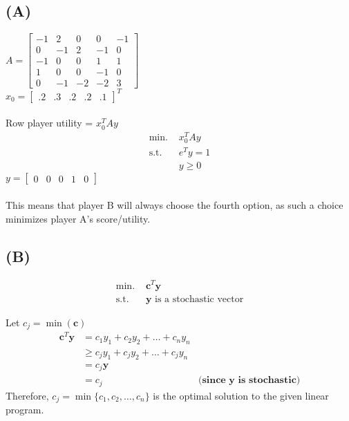 \documentclass[12pt]{article}
\begin{document}
\subsection*{(A)}
$A = \begin{bmatrix}
    -1 & 2 & 0 & 0 & -1 \\
    0 & -1 & 2 & -1 & 0 \\
    -1 & 0 & 0 & 1 & 1 \\
    1 & 0 & 0 & -1 & 0 \\
    0 & -1 & -2 & -2 & 3
\end{bmatrix}$ \\
$x_0 = \begin{bmatrix}
    .2 & .3 & .2 & .2 & .1
\end{bmatrix}^T$ \\
\\
Row player utility = $x_0^T A y$ \\
\begin{align*}
    \text{min. } & x_0^T A y \\
    \text{s.t. } & e^Ty = 1 \\
    & y \geq 0
\end{align*}
$y = \begin{bmatrix}
    0 & 0 & 0 & 1 & 0
\end{bmatrix}$ \\
\\
This means that player B will always choose the fourth option, as such a choice minimizes player A's score/utility.

\subsection*{(B)}
\begin{align*}
    \text{min. } & \mathbf{c}^T \mathbf{y} \\
    \text{s.t. } & \mathbf{y} \text{ is a stochastic vector}
\end{align*}

Let $c_j = \min(\mathbf{c})$ \\
\begin{align*}
    \mathbf{c}^T \mathbf{y} &= c_1y_1 + c_2y_2 + \dots + c_ny_n \\
    &\geq c_jy_1 + c_jy_2 + \dots + c_jy_n \\
    &=c_j\mathbf{y} \\
    &=c_j & \textbf{(since $\mathbf{y}$ is stochastic)}
\end{align*}
Therefore, $c_j = \min\{c_1, c_2, \dots, c_n\}$ is the optimal solution to the given linear program.
\end{document}
